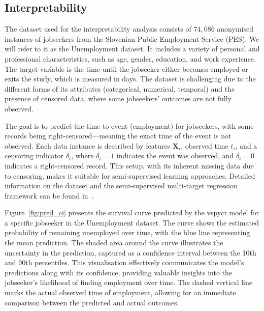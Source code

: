 \documentclass[3p,review,authoryear]{elsarticle}
\begin{document}
\subsection{Interpretability}

The dataset used for the interpretability analysis consists of $74,086$ anonymised instances of jobseekers from the Slovenian Public Employment Service (PES).
We will refer to it as the Unemployment dataset.
It includes a variety of personal and professional characteristics, such as age, gender, education, and work experience.
The target variable is the time until the jobseeker either becomes employed or exits the study, which is measured in days.
The dataset is challenging due to the different forms of its attributes (categorical, numerical, temporal) and the presence of censored data, where some jobseekers’ outcomes are not fully observed.

The goal is to predict the time-to-event (employment) for jobseekers, with some records being right-censored—meaning the exact time of the event is not observed.
Each data instance is described by features \(\mathbf{X}_i\), observed time \(t_i\), and a censoring indicator \(\delta_i\), where \(\delta_i = 1\) indicates the event was observed, and \(\delta_i = 0\) indicates a right-censored record.
This setup, with its inherent missing data due to censoring, makes it suitable for semi-supervised learning approaches.
Detailed information on the dataset and the semi-supervised multi-target regression framework can be found in~\cite{Andonovikj_2024}.

Figure~\ref{fig:pred_ci} presents the survival curve predicted by the \gls{vspyct} model for a specific jobseeker in the Unemployment dataset.
The curve shows the estimated probability of remaining unemployed over time, with the blue line representing the mean prediction.
The shaded area around the curve illustrates the uncertainty in the prediction, captured as a confidence interval between the 10th and 90th percentiles.
This visualisation effectively communicates the model's predictions along with its confidence, providing valuable insights into the jobseeker's likelihood of finding employment over time.
The dashed vertical line marks the actual observed time of employment, allowing for an immediate comparison between the predicted and actual outcomes.
\end{document}
